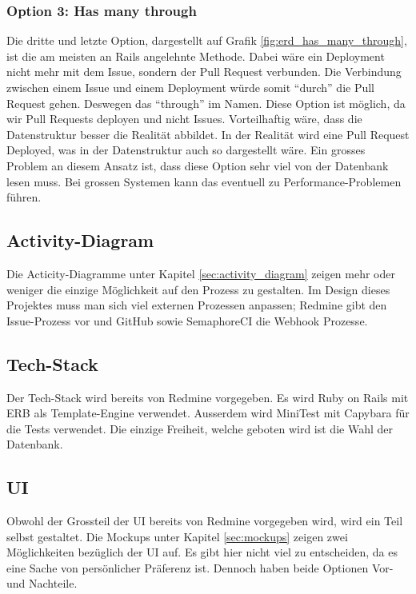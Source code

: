 \subsubsection{Option 3: Has many through}
\label{sec:decide_has_many_through}
Die dritte und letzte Option, dargestellt auf Grafik \ref{fig:erd_has_many_through}, ist die am meisten an Rails angelehnte
Methode. Dabei wäre ein Deployment nicht mehr mit dem Issue, sondern der Pull Request verbunden. Die Verbindung zwischen
einem Issue und einem Deployment würde somit \enquote{durch} die Pull Request gehen. Deswegen das \enquote{through} im Namen.
Diese Option ist möglich, da wir Pull Requests deployen und nicht Issues. \newline
Vorteilhaftig wäre, dass die Datenstruktur besser die Realität abbildet. In der Realität wird eine Pull Request Deployed,
was in der Datenstruktur auch so dargestellt wäre. \newline
Ein grosses Problem an diesem Ansatz ist, dass diese Option sehr viel von der Datenbank lesen muss. Bei grossen Systemen
kann das eventuell zu Performance-Problemen führen.

\subsection{Activity-Diagram}
Die Acticity-Diagramme unter Kapitel \ref{sec:activity_diagram} zeigen mehr oder weniger die einzige Möglichkeit auf den
Prozess zu gestalten. Im Design dieses Projektes muss man sich viel externen Prozessen anpassen; Redmine gibt den
Issue-Prozess vor und GitHub sowie SemaphoreCI die Webhook Prozesse.

\subsection{Tech-Stack}
Der Tech-Stack wird bereits von Redmine vorgegeben. Es wird Ruby on Rails mit ERB als Template-Engine verwendet. Ausserdem
wird MiniTest mit Capybara für die Tests verwendet. \newline
Die einzige Freiheit, welche geboten wird ist die Wahl der Datenbank.

\subsection{UI}
Obwohl der Grossteil der UI bereits von Redmine vorgegeben wird, wird ein Teil selbst gestaltet. Die Mockups unter Kapitel
\ref{sec:mockups} zeigen zwei Möglichkeiten bezüglich der UI auf. \newline
Es gibt hier nicht viel zu entscheiden, da es eine Sache von persönlicher Präferenz ist. Dennoch haben beide Optionen
Vor- und Nachteile. \newline

